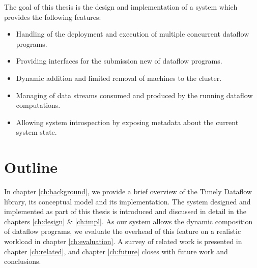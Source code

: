 The goal of this thesis is the design and implementation of a system which
provides the following features:

\begin{itemize}
\item Handling of the deployment and execution of multiple concurrent dataflow programs.
\item Providing interfaces for the submission new of dataflow programs.
\item Dynamic addition and limited removal of machines to the cluster.
\item Managing of data streams consumed and produced by the running dataflow computations.
\item Allowing system introspection by exposing metadata about the current system state.
\end{itemize}

\section{Outline}

In chapter \ref{ch:background}, we provide a brief overview of
the Timely Dataflow library, its conceptual model and its implementation. The
system designed and implemented as part of this thesis is introduced and
discussed in detail in the chapters \ref{ch:design} \& \ref{ch:impl}. As our
system allows the dynamic composition of dataflow programs, we evaluate the
overhead of this feature on a realistic workload in chapter \ref{ch:evaluation}.
A survey of related work is presented in chapter \ref{ch:related}, and chapter
\ref{ch:future} closes with future work and conclusions.
